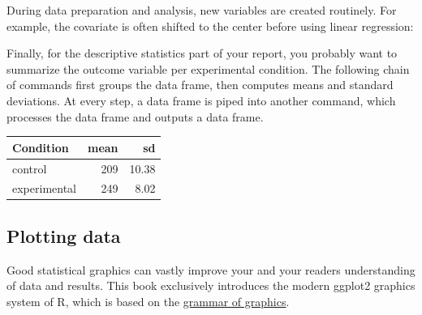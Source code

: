 \documentclass[]{svmono}
\newenvironment{Shaded}{\begin{snugshade}}{\end{snugshade}}
\newcommand{\KeywordTok}[1]{\textcolor[rgb]{0.13,0.29,0.53}{\textbf{#1}}}
\newcommand{\DataTypeTok}[1]{\textcolor[rgb]{0.13,0.29,0.53}{#1}}
\newcommand{\StringTok}[1]{\textcolor[rgb]{0.31,0.60,0.02}{#1}}
\newcommand{\OperatorTok}[1]{\textcolor[rgb]{0.81,0.36,0.00}{\textbf{#1}}}
\newcommand{\NormalTok}[1]{#1}
\begin{document}
During data preparation and analysis, new variables are created
routinely. For example, the covariate is often shifted to the center
before using linear regression:

\begin{Shaded}
\end{Shaded}

Finally, for the descriptive statistics part of your report, you
probably want to summarize the outcome variable per experimental
condition. The following chain of commands first groups the data frame,
then computes means and standard deviations. At every step, a data frame
is piped into another command, which processes the data frame and
outputs a data frame.

\begin{Shaded}
\end{Shaded}

\begin{tabular}{l|r|r}
\hline
Condition & mean & sd\\
\hline
control & 209 & 10.38\\
\hline
experimental & 249 & 8.02\\
\hline
\end{tabular}

\subsection{Plotting data}\label{plotting-data}

Good statistical graphics can vastly improve your and your readers
understanding of data and results. This book exclusively introduces the
modern ggplot2 graphics system of R, which is based on the
\href{http://zevross.com/blog/2014/08/04/beautiful-plotting-in-r-a-ggplot2-cheatsheet-3/}{grammar
of graphics}.
\end{document}
